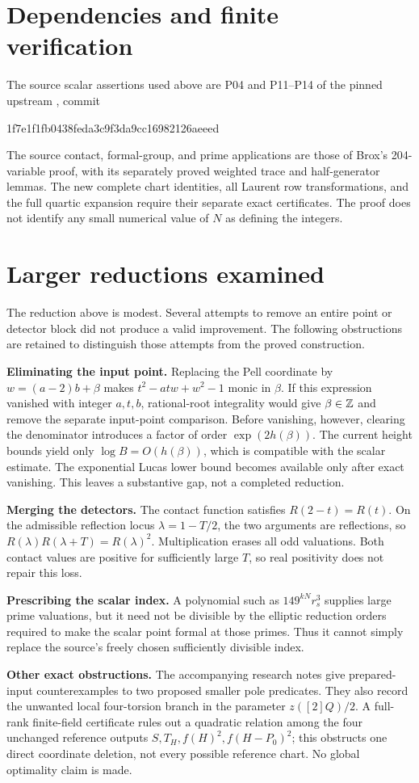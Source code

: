 \documentclass[11pt]{article}
\begin{document}
\section*{Dependencies and finite verification}
The source scalar assertions used above are P04 and P11--P14 of the
pinned upstream ,
commit
\begin{center}\small\ttfamily 1f7e1f1fb0438feda3c9f3da9cc16982126aeeed\end{center}
The source contact, formal-group, and prime applications are those of
Brox's 204-variable proof, with its separately proved weighted trace
and half-generator lemmas. The new complete chart identities, all
Laurent row transformations, and the full quartic expansion require their
separate exact certificates. The proof does not identify any small
numerical value of $N$ as defining the integers.
\section*{Larger reductions examined}
The reduction above is modest. Several attempts to remove an entire
point or detector block did not produce a valid improvement. The
following obstructions are retained to distinguish those attempts from
the proved construction.

\textbf{Eliminating the input point.}
Replacing the Pell coordinate by $w=(a-2)b+\beta$ makes
$t^2-atw+w^2-1$ monic in $\beta$. If this expression vanished with
integer $a,t,b$, rational-root integrality would give $\beta\in\mathbb Z$
and remove the separate input-point comparison. Before vanishing,
however, clearing the denominator introduces a factor of order
$\exp(2h(\beta))$. The current height bounds yield only
$\log B=O(h(\beta))$, which is compatible with the scalar estimate.
The exponential Lucas lower bound becomes available only after exact
vanishing. This leaves a substantive gap, not a completed reduction.

\textbf{Merging the detectors.}
The contact function satisfies $R(2-t)=R(t)$. On the admissible reflection
locus $\lambda=1-T/2$, the two arguments are reflections, so
$R(\lambda)R(\lambda+T)=R(\lambda)^2$. Multiplication erases all odd
valuations. Both contact values are positive for sufficiently large
$T$, so real positivity does not repair this loss.

\textbf{Prescribing the scalar index.}
A polynomial such as $149^{kN}r_s^3$ supplies large prime valuations,
but it need not be divisible by the elliptic reduction orders required
to make the scalar point formal at those primes. Thus it cannot simply
replace the source's freely chosen sufficiently divisible index.

\textbf{Other exact obstructions.}
The accompanying research notes give prepared-input counterexamples to
two proposed smaller pole predicates. They also record the unwanted
local four-torsion branch in the parameter $z([2]Q)/2$. A full-rank
finite-field certificate rules out a quadratic relation among the four
unchanged reference outputs $S,T_H,f(H)^2,f(H-P_0)^2$; this obstructs
one direct coordinate deletion, not every possible reference chart.
No global optimality claim is made.
\end{document}
